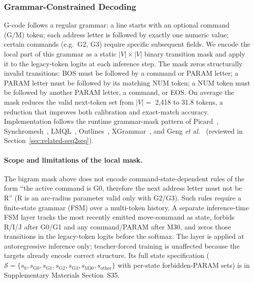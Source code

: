 \documentclass[sensors,article,submit,moreauthors,pdftex]{Definitions/mdpi}
\newcommand{\etal}{\textit{et al.}}
\begin{document}
\subsubsection{Grammar-Constrained Decoding}
\label{sec:grammar}

G-code follows a regular grammar: a line starts with an optional command (G/M) token; each address letter is followed by exactly one numeric value; certain commands (e.g.\ G2, G3) require specific subsequent fields. We encode the local part of this grammar as a static $|V| \times |V|$ binary transition mask and apply it to the legacy-token logits at each inference step. The mask zeros structurally invalid transitions: BOS must be followed by a command or PARAM letter; a PARAM letter must be followed by its matching NUM token; a NUM token must be followed by another PARAM letter, a command, or EOS. On average the mask reduces the valid next-token set from $|V|=$ 2{,}418 to 31.8 tokens, a reduction that improves both calibration and exact-match accuracy. Implementation follows the runtime grammar-mask pattern of Picard~\cite{picard}, Synchromesh~\cite{synchromesh}, LMQL~\cite{lmql}, Outlines~\cite{outlines}, XGrammar~\cite{xgrammar}, and Geng \etal~\cite{geng2023gcd} (reviewed in Section~\ref{sec:related-seq2seq}).

\paragraph{Scope and limitations of the local mask.} The bigram mask above does not encode command-state-dependent rules of the form ``the active command is G0, therefore the next address letter must not be R'' (R is an arc-radius parameter valid only with G2/G3). Such rules require a finite-state grammar (FSM) over a multi-token history. A separate inference-time FSM layer tracks the most recently emitted move-command as state, forbids R/I/J after G0/G1 and any command/PARAM after M30, and zeros those transitions in the legacy-token logits before the softmax. The layer is applied at autoregressive inference only; teacher-forced training is unaffected because the targets already encode correct structure. Its full state specification ($\mathcal{S}=\{s_0,s_{\text{G0}},s_{\text{G1}},s_{\text{G2}},s_{\text{G3}},s_{\text{M30}},s_{\text{other}}\}$ with per-state forbidden-PARAM sets) is in Supplementary Materials Section~S35.
\end{document}
